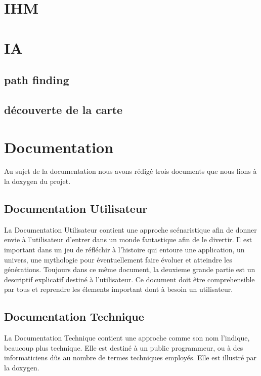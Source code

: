 \documentclass[a4paper 12pts]{article}
\begin{document}
\section{IHM}


\newpage
\section{IA}


\subsection{path finding}
\subsection{découverte de la carte}

\newpage

\section{Documentation}


Au sujet de la documentation nous avons rédigé trois documents que nous lions à la doxygen du projet.

\subsection{Documentation Utilisateur}

La Documentation Utilisateur contient une approche scénaristique afin de donner envie à l'utilisateur d'entrer dans un monde fantastique
afin de le divertir. Il est important dans un jeu de réfléchir à l'histoire qui entoure une application, un univers, une mythologie pour éventuellement
faire évoluer et atteindre les générations.
Toujours dans ce même document, la deuxieme grande partie est un descriptif explicatif destiné à l'utilisateur.
Ce document doit être comprehensible par tous et reprendre les élements important dont à besoin un utilisateur.

\subsection{Documentation Technique}

La Documentation Technique contient une approche comme son nom l'indique, beaucoup plus technique. Elle est destiné à un public programmeur,
ou à des informaticiens dûs au nombre de termes techniques employés.
Elle est illustré par la doxygen.
\end{document}
